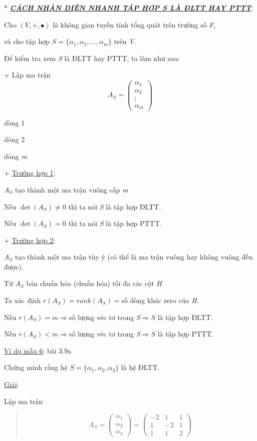\documentclass[12pt,a4paper]{article}
\begin{document}
* \emph{\textbf{\ul{CÁCH NHẬN DIỆN NHANH TẬP HỢP S LÀ ĐLTT HAY PTTT}}}:

Cho $(V, +, \bullet)$ là không
gian tuyến tính tổng quát trên trường số \emph{F},

và cho tập hợp $S = \{\alpha_1, \alpha_2, \dots, \alpha_m\}$
trên \emph{V}.

Để kiểm tra xem \emph{S} là ĐLTT hay PTTT, ta làm như sau:

+ Lập ma trận \[ A_S = \begin{pmatrix} \alpha_1 \\ \alpha_2 \\ \vdots \\ \alpha_m \end{pmatrix} \]

dòng 1

dòng 2

dòng \emph{m}

+ \ul{Trường hợp 1}:

$A_S$ tạo thành một
ma trận vuông cấp \emph{m}

Nếu $\det(A_S) \neq 0$ thì ta nói
\emph{S} là tập hợp ĐLTT.

Nếu $\det(A_S) = 0$ thì ta nói
\emph{S} là tập hợp PTTT.

+ \ul{Trường hợp 2}:

$A_S$ tạo thành một
ma trận tùy ý (có thể là ma trận vuông hay không vuông đều được).

Từ $A_S$ bán chuẩn
hóa (chuẩn hóa) tối đa các cột
$H$

Ta xác định $r(A_S) = rank(A_S) = $số
dòng khác zero của \emph{H}.

Nếu $r(A_S) = m \Rightarrow $số lượng
véc tơ trong
\emph{S}$\Rightarrow S$ là tập
hợp ĐLTT.

Nếu $r(A_S) < m \Rightarrow $số lượng
véc tơ trong
\emph{S}$\Rightarrow S$ là tập
hợp PTTT.

\ul{Ví dụ mẫu 6}: bài 3.9a

Chứng minh rằng hệ
$S = \{\alpha_1, \alpha_2, \alpha_3\}$ là hệ ĐLTT.

\ul{Giải}:

Lập ma trận

\begin{quote}
\[ A_S = \begin{pmatrix} \alpha_1 \\ \alpha_2 \\ \alpha_3 \end{pmatrix} = \begin{pmatrix} -2 & 1 & 1 \\ 1 & -2 & 1 \\ 1 & 1 & 2 \end{pmatrix} \]
\end{quote}
\end{document}
